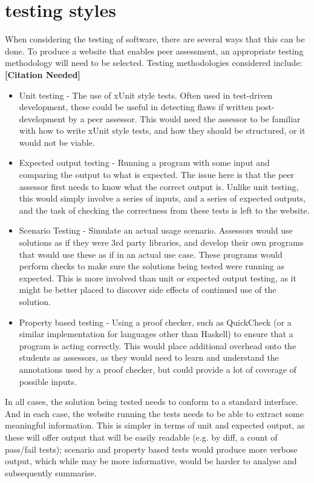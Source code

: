 \documentclass[a4paper,11pt]{report}
\newcommand{\cn}{\textbf{[Citation Needed]}}
\begin{document}
\section{testing styles}
When considering the testing of software, there are several ways that this can be done. To produce a website that enables peer assessment, an appropriate testing methodology will need to be selected. Testing methodologies considered include:\cn
\begin{itemize}
 \item Unit testing - The use of xUnit style tests. Often used in test-driven development, these could be useful in detecting flaws if written post-development by a peer assessor. This would need the assessor to be familiar with how to write xUnit style tests, and how they should be structured, or it would not be viable.
 \item Expected output testing - Running a program with some input and comparing the output to what is expected. The issue here is that the peer assessor first needs to know what the correct output is. Unlike unit testing, this would simply involve a series of inputs, and a series of expected outputs, and the task of checking the correctness from these tests is left to the website.
 \item Scenario Testing - Simulate an actual usage scenario. Assessors would use solutions as if they were 3rd party libraries, and develop their own programs that would use these as if in an actual use case. These programs would perform checks to make sure the solutions being tested were running as expected. This is more involved than unit or expected output testing, as it might be better placed to discover side effects of continued use of the solution.
 \item Property based testing - Using a proof checker, such as QuickCheck (or a similar implementation for languages other than Haskell) to ensure that a program is acting correctly. This would place additional overhead onto the students as assessors, as they would need to learn and understand the annotations used by a proof checker, but could provide a lot of coverage of possible inputs.
\end{itemize}
In all cases, the solution being tested needs to conform to a standard interface. And in each case, the website running the tests needs to be able to extract some meaningful information. This is simpler in terms of unit and expected output, as these will offer output that will be easily readable (e.g. by diff, a count of pass/fail tests); scenario and property based tests would produce more verbose output, which while may be more informative, would be harder to analyse and subsequently summarise. 
\end{document}
